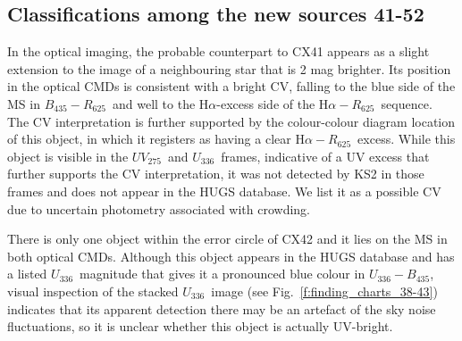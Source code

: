 \documentclass[fleqn,usenatbib]{mnras}
\newcommand{\B}{\mbox{$B_{435}$}}
\newcommand{\R}{\mbox{$R_{625}$}}
\newcommand{\br}{\mbox{$\B\!-\!\R$}}
\newcommand{\ha}{\mbox{H$\alpha$}}
\newcommand{\hr}{\mbox{$\ha\!-\!\R$}}
\newcommand{\UV}{\mbox{$UV_{275}$}}
\newcommand{\U}{\mbox{$U_{336}$}}
\newcommand{\ub}{\mbox{$\U\!-\!\B$}}
\begin{document}
\subsection{Classifications among the new sources 41-52}
\label{sec_classification_41_52}
In the optical imaging, the probable counterpart to CX41 appears as a slight extension to the image of a  neighbouring star that is 2 mag brighter. Its position in the optical CMDs is consistent with a bright CV, falling to the blue side of the MS in \br\ and well to the \ha-excess side of the \hr\ sequence. The CV interpretation is further supported by the colour-colour diagram location of this object, in which it registers as having a clear \hr\ excess. While this object is visible in the \UV\ and \U\ frames, indicative of a UV excess that further supports the CV interpretation, it was not detected by KS2 in those frames and does not appear in the HUGS database. We list it as a possible CV due to uncertain photometry associated with crowding. 

There is only one object within the error circle of CX42 and it lies on the MS in both optical CMDs. Although this object appears in the HUGS database and has a listed \U\ magnitude that gives it a pronounced blue colour in \ub, visual inspection of the stacked \U\ image (see Fig.~\ref{f:finding_charts_38-43}) indicates that its apparent detection there may be an artefact of the sky noise fluctuations, so it is unclear whether this object is actually UV-bright. 
\end{document}

